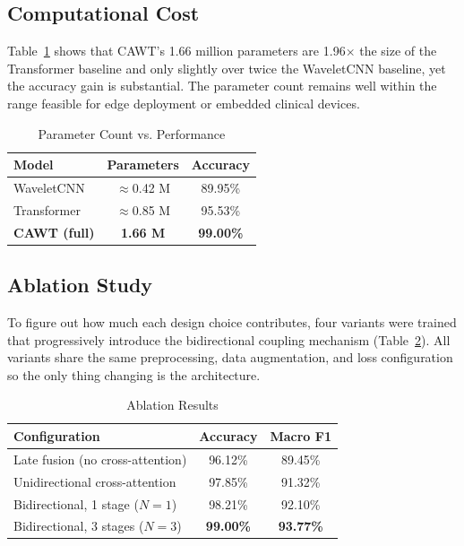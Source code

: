 \documentclass[conference]{IEEEtran}
\begin{document}
\subsection{Computational Cost}
Table~\ref{tab:computational} shows that CAWT's 1.66 million parameters are 1.96$\times$ the size of the Transformer baseline and only slightly over twice the WaveletCNN baseline, yet the accuracy gain is substantial. The parameter count remains well within the range feasible for edge deployment or embedded clinical devices.
 
\begin{table}[H]
\centering
\caption{Parameter Count vs. Performance}
\label{tab:computational}
\footnotesize
\begin{tabular}{@{}lcc@{}}
\toprule
\textbf{Model} & \textbf{Parameters} & \textbf{Accuracy} \\
\midrule
WaveletCNN & $\approx$0.42 M & 89.95\% \\
Transformer & $\approx$0.85 M & 95.53\% \\
\textbf{CAWT (full)} & \textbf{1.66 M} & \textbf{99.00\%} \\
\bottomrule
\end{tabular}
\end{table}
 
\subsection{Ablation Study}
To figure out how much each design choice contributes, four variants were trained that progressively introduce the bidirectional coupling mechanism (Table~\ref{tab:ablation}). All variants share the same preprocessing, data augmentation, and loss configuration so the only thing changing is the architecture.
 
\begin{table}[H]
\centering
\caption{Ablation Results}
\label{tab:ablation}
\footnotesize
\begin{tabular}{@{}lcc@{}}
\toprule
\textbf{Configuration} & \textbf{Accuracy} & \textbf{Macro F1} \\
\midrule
Late fusion (no cross-attention) & 96.12\% & 89.45\% \\
Unidirectional cross-attention & 97.85\% & 91.32\% \\
Bidirectional, 1 stage ($N=1$) & 98.21\% & 92.10\% \\
Bidirectional, 3 stages ($N=3$) & \textbf{99.00\%} & \textbf{93.77\%} \\
\bottomrule
\end{tabular}
\end{table}
 
\end{document}
